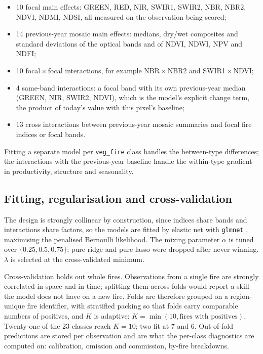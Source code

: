 \documentclass[11pt,a4paper]{article}
\begin{document}
\begin{itemize}
  \item 10 focal main effects: GREEN, RED, NIR, SWIR1, SWIR2, NBR, NBR2, NDVI, NDMI, NDSI, all
        measured on the observation being scored;
  \item 14 previous-year mosaic main effects: medians, dry/wet composites and standard deviations
        of the optical bands and of NDVI, NDWI, NPV and NDFI;
  \item 10 focal\,\(\times\)\,focal interactions, for example NBR\,\(\times\)\,NBR2 and
        SWIR1\,\(\times\)\,NDVI;
  \item 4 same-band interactions: a focal band with its own previous-year median (GREEN, NIR,
        SWIR2, NDVI), which is the model's explicit change term, the product of today's value with
        this pixel's baseline;
  \item 13 cross interactions between previous-year mosaic summaries and focal fire indices or
        focal bands.
\end{itemize}

Fitting a separate
model per \texttt{veg\_fire} class handles the between-type differences; the interactions with the
previous-year baseline handle the within-type gradient in productivity, structure and seasonality.

\subsection{Fitting, regularisation and cross-validation}

The design is strongly collinear by construction, since indices share bands and interactions share
factors, so the models are fitted by elastic net \parencite{zou2005elasticnet} with \texttt{glmnet}
\parencite{friedman2010glmnet}, maximising the penalised Bernoulli likelihood. The mixing
parameter \(\alpha\) is tuned over \(\{0.25, 0.5, 0.75\}\); pure ridge and pure lasso were dropped
after never winning. \(\lambda\) is selected at the cross-validated minimum.

Cross-validation holds out whole fires. Observations from a single fire are strongly correlated in
space and in time; splitting them across folds would report a skill the model does not have on a
new fire. Folds are therefore grouped on a region-unique fire identifier, with stratified packing
so that folds carry comparable numbers of positives, and \(K\) is adaptive:
\(K = \min(10, \text{fires with positives})\). Twenty-one of the 23 classes reach \(K = 10\); two
fit at 7 and 6. Out-of-fold predictions are stored per observation and are what the per-class
diagnostics are computed on: calibration, omission and commission, by-fire breakdowns.
\end{document}
